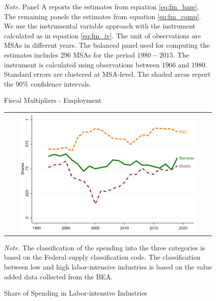 \documentclass[dv_diss_main.tex]{subfiles}
\begin{document}
\begin{figure}[H]
\begin{center}
\begin{tabular}[c]{ccc}
    \end{tabular}
    \end{center}
    \caption{Fiscal Multipliers - Employment}
    \footnotesize{\textit{Note. } Panel A reports the estimates from equation \eqref{eq:fm_base}. The remaining panels the estimates from equation \eqref{eq:fm_comp}. We use the instrumental variable approach with the instrument calculated as in equation \eqref{eq:fm_iv}. The unit of observations are MSAs in different years. The balanced panel used for computing the estimates includes $296$ MSAs for the period $1980-2015$. The instrument is calculated using observations between $1966$ and $1980$. Standard errors are clustered at MSA-level. The shaded areas report the $90\%$ confidence intervals.}
    \label{fig:fm_employment}
\end{figure}
\newpage

\begin{figure}[H]
    \begin{center}
        \begin{tabular}[c]{c}
   
    {\includegraphics[height=2.5in,width=4.5in]{figures/graph_share_laborintensity.png}} \\[0.1in]

    
    \end{tabular}
    \end{center}
    
    \caption{Share of Spending in Labor-intensive Industries}
    \footnotesize{\textit{Note. } The classification of the spending into the three categories is based on the Federal supply classification code. The classification between low and high labor-intensive industries is based on the value added data collected from the BEA.}
    \label{fig:shlabint_comp}
\end{figure}
\newpage
\end{document}
